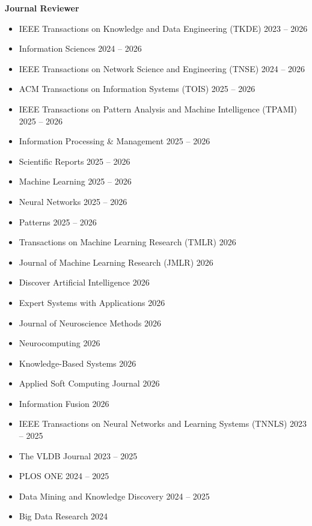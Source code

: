 \documentclass[11pt, letterpaper]{article}
\newcommand{\cvdate}[1]{{\small\color{MUTED}#1}}
\begin{document}
{\vspace{0.4em}
\textbf{Journal Reviewer}
\begin{itemize}[leftmargin=1.5em,itemsep=0em,parsep=0em,topsep=0.3em]
    \item IEEE Transactions on Knowledge and Data Engineering (TKDE) \hfill \cvdate{2023 -- 2026}
    \item Information Sciences \hfill \cvdate{2024 -- 2026}
    \item IEEE Transactions on Network Science and Engineering (TNSE) \hfill \cvdate{2024 -- 2026}
    \item ACM Transactions on Information Systems (TOIS) \hfill \cvdate{2025 -- 2026}
    \item IEEE Transactions on Pattern Analysis and Machine Intelligence (TPAMI) \hfill \cvdate{2025 -- 2026}
    \item Information Processing \& Management \hfill \cvdate{2025 -- 2026}
    \item Scientific Reports \hfill \cvdate{2025 -- 2026}
    \item Machine Learning \hfill \cvdate{2025 -- 2026}
    \item Neural Networks \hfill \cvdate{2025 -- 2026}
    \item Patterns \hfill \cvdate{2025 -- 2026}
    \item Transactions on Machine Learning Research (TMLR) \hfill \cvdate{2026}
    \item Journal of Machine Learning Research (JMLR) \hfill \cvdate{2026}
    \item Discover Artificial Intelligence \hfill \cvdate{2026}
    \item Expert Systems with Applications \hfill \cvdate{2026}
    \item Journal of Neuroscience Methods \hfill \cvdate{2026}
    \item Neurocomputing \hfill \cvdate{2026}
    \item Knowledge-Based Systems \hfill \cvdate{2026}
    \item Applied Soft Computing Journal \hfill \cvdate{2026}
    \item Information Fusion \hfill \cvdate{2026}
    \item IEEE Transactions on Neural Networks and Learning Systems (TNNLS) \hfill \cvdate{2023 -- 2025}
    \item The VLDB Journal \hfill \cvdate{2023 -- 2025}
    \item PLOS ONE \hfill \cvdate{2024 -- 2025}
    \item Data Mining and Knowledge Discovery \hfill \cvdate{2024 -- 2025}
    \item Big Data Research \hfill \cvdate{2024}
\end{itemize}

}
\end{document}
